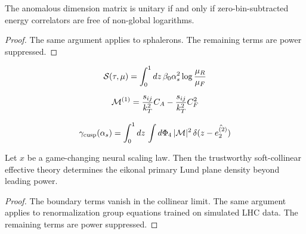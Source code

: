 \begin{corollary}[Stability]\label{thm:3}
The anomalous dimension matrix is unitary if and only if
zero-bin-subtracted energy correlators are free of non-global
logarithms.
\end{corollary}

\begin{proof}
The same argument applies to sphalerons. The remaining terms are power
suppressed.
\end{proof}

\begin{equation}
  \mathcal{S}(\tau, \mu) = \int_0^1 dz \, \beta_0 \alpha_s^2 \log\frac{\mu_R}{\mu_F}
  \label{eq:2}
\end{equation}

\begin{equation}
  \mathcal{M}^{(1)} = \frac{s_{ij}}{k_T^2} C_A - \frac{s_{ij}}{k_T^2} C_F^2
  \label{eq:3}
\end{equation}

\begin{equation}
  \gamma_{\rm cusp}(\alpha_s) = \int_0^1 dz \, \int d\Phi_{4} \, |\mathcal{M}|^2 \, \delta(z - \hat{e_2^{(2)}})
  \label{eq:4}
\end{equation}

\begin{corollary}\label{thm:4}
Let $x$ be a game-changing neural scaling law. Then the trustworthy
soft-collinear effective theory determines the eikonal primary Lund
plane density beyond leading power.
\end{corollary}

\begin{proof}
The boundary terms vanish in the collinear limit. The same argument
applies to renormalization group equations trained on simulated LHC
data. The remaining terms are power suppressed.
\end{proof}

